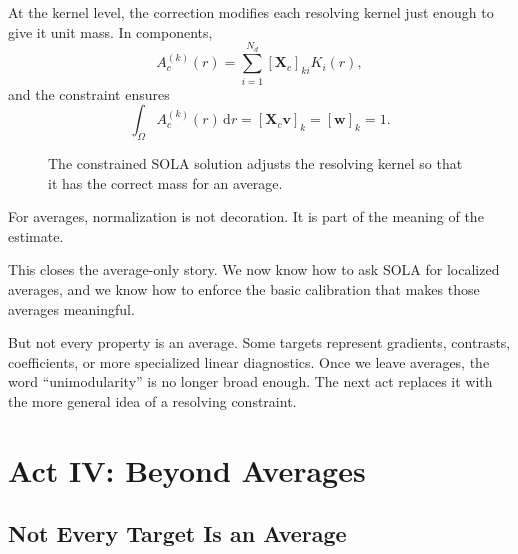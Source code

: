 \documentclass[11pt,openany]{book}
\theoremstyle{definition}
\theoremstyle{remark}
\newcommand{\dd}{\,\mathrm d}
\begin{document}
At the kernel level, the correction modifies each resolving kernel just enough to give it unit
mass. In components,
\[
  A_c^{(k)}(r)
  =
  \sum_{i=1}^{N_d}[\mathbf X_c]_{ki}K_i(r),
\]
and the constraint ensures
\[
  \int_\Omega A_c^{(k)}(r)\dd r
  =
  [\mathbf X_c\mathbf v]_k
  =
  [\mathbf w]_k
  =
  1.
\]

\begin{figure}[ht]
  \centering
  \caption{The constrained SOLA solution adjusts the resolving kernel so that it has the correct
  mass for an average.}
  \label{fig:act3-constrained-kernel}
\end{figure}

\begin{lessonbox}
For averages, normalization is not decoration. It is part of the meaning of the estimate.
\end{lessonbox}

This closes the average-only story. We now know how to ask SOLA for localized averages, and
we know how to enforce the basic calibration that makes those averages meaningful.

But not every property is an average. Some targets represent gradients, contrasts, coefficients,
or more specialized linear diagnostics. Once we leave averages, the word ``unimodularity'' is no
longer broad enough. The next act replaces it with the more general idea of a resolving
constraint.




\part{Act IV: Beyond Averages}

\chapter{Not Every Target Is an Average}
\end{document}
